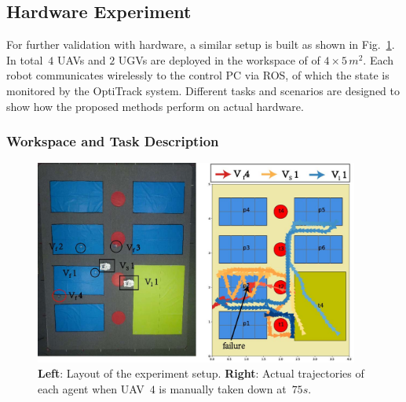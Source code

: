 \subsection{Hardware Experiment}\label{subsec:hardware-experiment}
For further validation with hardware,
a similar setup is built as shown in Fig.~\ref{fig:ws}.
In total~$4$ UAVs and $2$ UGVs are deployed in the workspace of of $4\times5\, m^2$.
Each robot communicates wirelessly to the control PC via ROS,
of which the state is monitored by the OptiTrack system.
Different tasks and scenarios are designed to show
how the proposed methods perform on actual hardware.

\subsubsection{Workspace and Task Description}\label{subsubsec:hw-ws-task}

\begin{figure}[t!]
  \begin{minipage}[t]{1\linewidth}
    \centering
	\includegraphics[width =0.95\textwidth]{figures/hardware_experiment/figure_12.jpg}
\end{minipage}%
\caption{\textbf{Left}:
Layout of the experiment setup.
\textbf{Right}: Actual trajectories of each agent when UAV~$4$ is manually taken down at~$75s$.
}
\label{fig:ws}
\end{figure}

